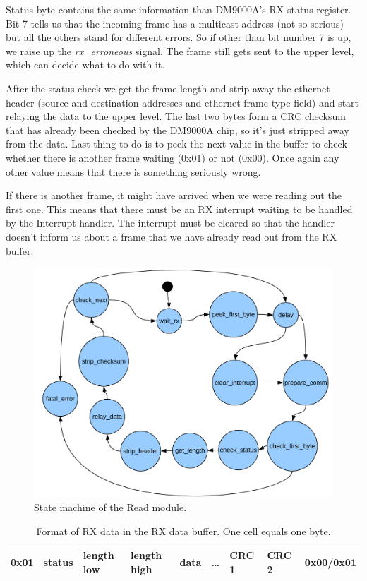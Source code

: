 \documentclass{article}
\begin{document}
Status byte contains the same information than DM9000A's RX status
register.  Bit 7 tells us that the incoming frame has a multicast
address (not so serious) but all the others stand for different
errors. So if other than bit number 7 is up, we raise up the
\emph{rx\_erroneous} signal. The frame still gets sent to the upper
level, which can decide what to do with it.

After the status check we get the frame length and strip away the
ethernet header (source and destination addresses and ethernet frame
type field) and start relaying the data to the upper level. The last
two bytes form a CRC checksum that has already been checked by the
DM9000A chip, so it's just stripped away from the data. Last thing to
do is to peek the next value in the buffer to check whether there is
another frame waiting (0x01) or not (0x00). Once again any other value
means that there is something seriously wrong.

If there is another frame, it might have arrived when we were reading
out the first one. This means that there must be an RX interrupt waiting
to be handled by the Interrupt handler. The interrupt must be cleared so
that the handler doesn't inform us about a frame that we have already
read out from the RX buffer.

\begin{figure}[hbt]
  \includegraphics[scale=.4]{Read_module_states}
  \caption{State machine of the Read module.}
  \label{fig:readStates}
\end{figure}

\begin{table}[hb]
  \begin{tabular}{|l|l|l|l|l|l|l|l|l|}
    \hline
    0x01 & status & length low & length high & data & \ldots & CRC 1 & CRC 2 & 0x00/0x01 \\
    \hline
  \end{tabular}
  \caption{Format of RX data in the RX data buffer. One cell equals one byte.}
  \label{tab:rxdata}
\end{table}
\end{document}
